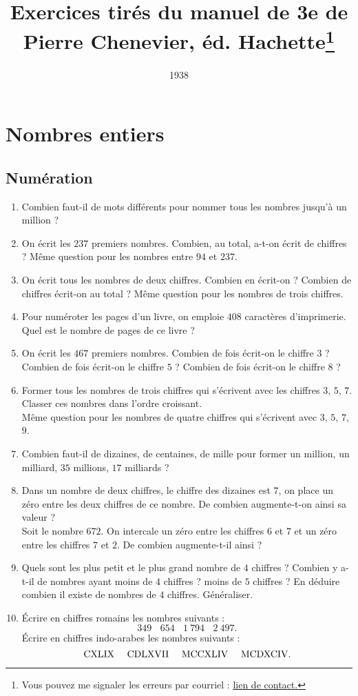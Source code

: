 \documentclass[12 pt]{report}
\author{ }
\title{\Large Exercices tirés du manuel de 3e de Pierre Chenevier, éd. Hachette\footnote{Vous pouvez me signaler les erreurs par courriel : \href{mailto:leturcq.d@orange.fr}{lien de contact.} 
	}
	}
\date{1938}
\theoremstyle{plain}
\newcounter{n}
\begin{document}
	\maketitle 
	
	
	
 \part{Nombres entiers}
 \chapter{Numération}
 
 \begin{enumerate}
 \item Combien faut-il de mots différents pour nommer tous les nombres jusqu'à un million ? 
 \item On écrit les $237$ premiers nombres. Combien, au total, a-t-on écrit de chiffres ? Même question pour les nombres entre $94$ et $237$. 
 \item On écrit tous les nombres de deux chiffres. Combien en écrit-on ? 
 Combien de chiffres écrit-on au total ? Même question pour les nombres de trois chiffres. 
 \item Pour numéroter les pages d'un livre, on emploie $408$ caractères d'imprimerie. Quel est le nombre de pages de ce livre ?
 \item On écrit les $467$ premiers nombres. Combien de fois écrit-on le chiffre $3$ ? Combien de fois écrit-on le chiffre $5$ ? Combien de fois écrit-on le chiffre $8$ ? 
 \item Former tous les nombres de trois chiffres qui s'écrivent avec les chiffres $3$, $5$, $7$. Classer ces nombres dans l'ordre croissant.\\
 Même question pour les nombres de quatre chiffres qui s'écrivent avec $3$, $5$, $7$, $9$. 
 \item Combien faut-il de dizaines, de centaines, de mille pour former un million, un milliard, $35$ millions, $17$ milliards ?
 \item Dans un nombre de deux chiffres, le chiffre des dizaines est $7$, on place un zéro entre les deux chiffres de ce nombre. De combien augmente-t-on ainsi sa valeur ? \\
 Soit le nombre $672$. On intercale un zéro entre les chiffres $6$ et $7$ et un zéro entre les chiffres $7$ et $2$. De combien augmente-t-il ainsi ? 
 \item Quels sont les plus petit et le plus grand nombre de $4$ chiffres ? Combien y a-t-il de nombres ayant moins de $4$ chiffres ? moins de $5$ chiffres ? En déduire combien il existe de nombres de $4$ chiffres. Généraliser. 
 \item Écrire en chiffres romains les nombres suivants : 
 \[ 349 \ \ \ \ 654 \ \ \ \ 1\ 794 \ \ \ \ 2\ 497. \]
 Écrire en chiffres indo-arabes les nombres suivants : 
 \[ \rm CXLIX \ \ \ \ CDLXVII \ \ \ \ MCCXLIV \ \ \ \ MCDXCIV. \]
 

\end{enumerate}
\end{document}
